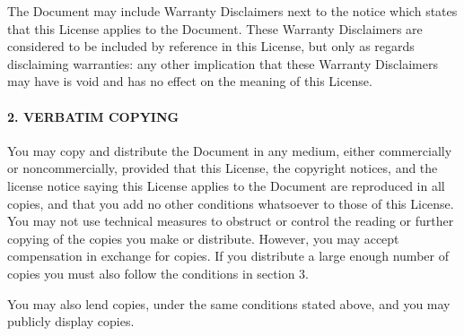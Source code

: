 \documentclass[10pt,]{book}
\theoremstyle{plain}
\theoremstyle{definition}
\theoremstyle{definition}
\numberwithin{equation}{chapter}
\begin{document}
\begin{footnotesize}
\par
\hypertarget{p-2250}{}%
The Document may include Warranty Disclaimers next to the notice which states that this License applies to the Document. These Warranty Disclaimers are considered to be included by reference in this License, but only as regards disclaiming warranties: any other implication that these Warranty Disclaimers may have is void and has no effect on the meaning of this License.%
\typeout{************************************************}
\typeout{************************************************}
\paragraph[{2. VERBATIM COPYING}]{2. VERBATIM COPYING}\hypertarget{gfdl-section2}{}
\hypertarget{p-2251}{}%
You may copy and distribute the Document in any medium, either commercially or noncommercially, provided that this License, the copyright notices, and the license notice saying this License applies to the Document are reproduced in all copies, and that you add no other conditions whatsoever to those of this License. You may not use technical measures to obstruct or control the reading or further copying of the copies you make or distribute. However, you may accept compensation in exchange for copies. If you distribute a large enough number of copies you must also follow the conditions in section 3.%
\par
\hypertarget{p-2252}{}%
You may also lend copies, under the same conditions stated above, and you may publicly display copies.%
\typeout{************************************************}
\typeout{************************************************}

\end{footnotesize}
\end{document}
